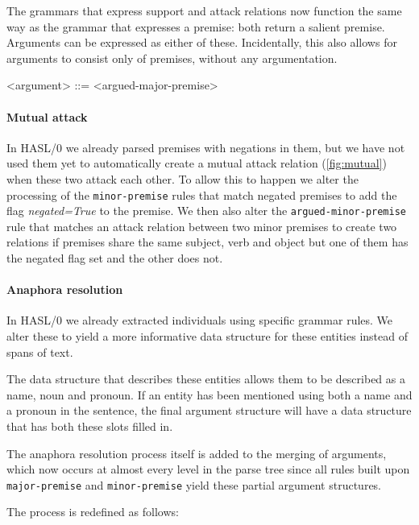 \noindent The grammars that express support and attack relations now function the same way as the grammar that expresses a premise: both return a salient premise. Arguments can be expressed as either of these. Incidentally, this also allows for arguments to consist only of premises, without any argumentation.

\begin{grammar}
<argument> ::= <argued-major-premise>
\end{grammar}

\paragraph{Mutual attack}
In HASL/0 we already parsed premises with negations in them, but we have not used them yet to automatically create a mutual attack relation (\autoref{fig:mutual}) when these two attack each other. To allow this to happen we alter the processing of the \texttt{minor-premise} rules that match negated premises to add the flag \emph{negated=True} to the premise. We then also alter the \texttt{argued-minor-premise} rule that matches an attack relation between two minor premises to create two relations if premises share the same subject, verb and object but one of them has the negated flag set and the other does not.

\paragraph{Anaphora resolution}
In HASL/0 we already extracted individuals using specific grammar rules. We alter these to yield a more informative data structure for these entities instead of spans of text.

The data structure that describes these entities allows them to be described as a name, noun and pronoun. If an entity has been mentioned using both a name and a pronoun in the sentence, the final argument structure will have a data structure that has both these slots filled in.

The anaphora resolution process itself is added to the merging of arguments, which now occurs at almost every level in the parse tree since all rules built upon \texttt{major-premise} and \texttt{minor-premise} yield these partial argument structures.

The process is redefined as follows:

